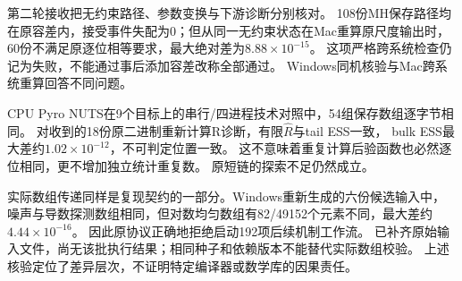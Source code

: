 第二轮接收把无约束路径、参数变换与下游诊断分别核对。
108份MH保存路径均在原容差内，接受事件失配为0；但从同一无约束状态在Mac重算原尺度输出时，
60份不满足原逐位相等要求，最大绝对差为$8.88\times10^{-15}$。
这项严格跨系统检查仍记为失败，不能通过事后添加容差改称全部通过。
Windows同机核验与Mac跨系统重算回答不同问题。

CPU Pyro NUTS在9个目标上的串行/四进程技术对照中，54组保存数组逐字节相同。
对收到的18份原二进制重新计算R诊断，有限$\hat R$与tail ESS一致，
bulk ESS最大差约$1.02\times10^{-12}$，不可判定位置一致。
这不意味着重复计算后验函数也必然逐位相同，更不增加独立统计重复数。
原短链的探索不足仍然成立。

实际数组传递同样是复现契约的一部分。Windows重新生成的六份候选输入中，
噪声与导数探测数组相同，但对数均匀数组有82/49152个元素不同，最大差约$4.44\times10^{-16}$。
因此原协议正确地拒绝启动192项后续机制工作流。
已补齐原始输入文件，尚无该批执行结果；相同种子和依赖版本不能替代实际数组校验。
上述核验定位了差异层次，不证明特定编译器或数学库的因果责任。
